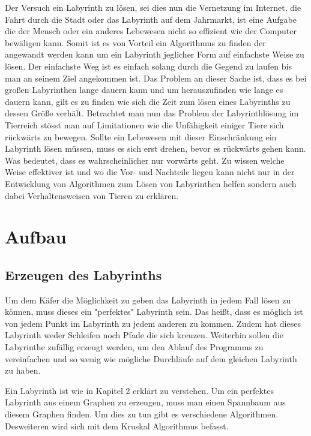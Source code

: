 \documentclass[12pt, a4paper, titlepage]{article}
\begin{document}
\bigskip

Der Versuch ein Labyrinth zu lösen, sei dies nun die Vernetzung im Internet, die Fahrt durch die Stadt oder das Labyrinth auf dem Jahrmarkt, ist eine Aufgabe die der Mensch oder ein anderes Lebewesen nicht so effizient wie der Computer bewäligen kann.
Somit ist es von Vorteil ein Algorithmus zu finden der angewandt werden kann um ein Labyrinth jeglicher Form auf einfachste Weise zu lösen. 
Der einfachste Weg ist es einfach solang durch die Gegend zu laufen bis man an seinem Ziel angekommen ist.
Das Problem an dieser Sache ist, dass es bei großen Labyrinthen lange dauern kann und um herauszufinden wie lange es dauern kann, gilt es zu finden wie sich die Zeit zum lösen eines Labyrinths zu dessen Größe verhält.
Betrachtet man nun das Problem der Labyrinthlösung im Tierreich stösst man auf Limitationen wie die Unfähigkeit einiger Tiere sich rückwärts zu bewegen. Sollte ein Lebewesen mit dieser Einschränkung ein Labyrinth lösen müssen, muss es sich erst drehen, bevor es rückwärts gehen kann. Was bedeutet, dass es wahrscheinlicher nur vorwärts geht. Zu wissen welche Weise effektiver ist und wo die Vor- und Nachteile liegen kann nicht nur in der Entwicklung von Algorithmen zum Lösen von Labyrinthen helfen sondern auch dabei Verhaltensweisen von Tieren zu erklären.


\newpage

\section{Aufbau}

\subsection{Erzeugen des Labyrinths}

Um dem Käfer die Möglichkeit zu geben das Labyrinth in jedem Fall lösen zu können, muss dieses ein "perfektes" Labyrinth sein.
Das heißt, dass es möglich ist von jedem Punkt im Labyrinth zu jedem anderen zu kommen.
Zudem hat dieses Labyrinth weder Schleifen noch Pfade die sich kreuzen.\cite{perfect_maze}
Weiterhin sollen die Labyrinthe zufällig erzeugt werden, um den Ablauf des Programms zu vereinfachen und so wenig wie mögliche Durchläufe auf dem gleichen Labyrinth zu haben.

\bigskip

Ein Labyrinth ist wie in Kapitel 2 erklärt zu verstehen.
Um ein perfektes Labyrinth aus einem Graphen zu erzeugen, muss man einen Spannbaum aus diesem Graphen finden.
Um dies zu tun gibt es verschiedene Algorithmen.
Desweiteren wird sich mit dem Kruskal \cite{maze} Algorithmus befasst.
\end{document}
